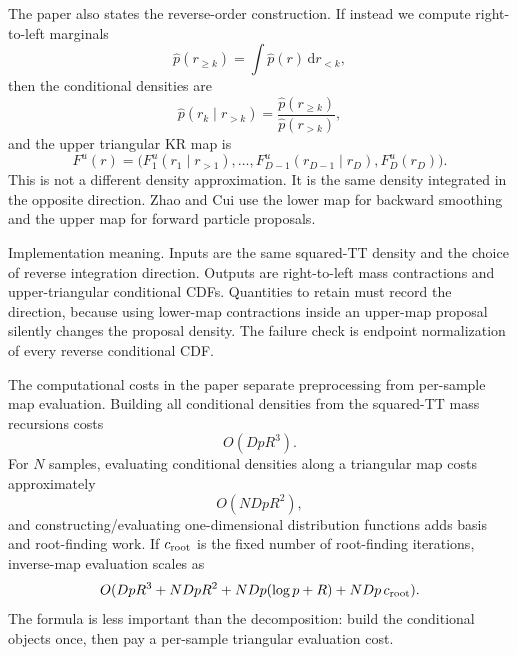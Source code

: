 \documentclass[11pt]{article}
\numberwithin{equation}{section}
\newcommand{\dd}{\,\mathrm d}
\begin{document}
The paper also states the reverse-order construction.  If instead we compute
right-to-left marginals
\begin{equation}
    \widehat p(r_{\ge k})
    =
    \int \widehat p(r)\dd r_{<k},
    \label{eq:p24-k6}
\end{equation}
then the conditional densities are
\begin{equation}
    \widehat p(r_k\mid r_{>k})
    =
    \frac{\widehat p(r_{\ge k})}{\widehat p(r_{>k})},
    \label{eq:p24-k7}
\end{equation}
and the upper triangular KR map is
\begin{equation}
    F^u(r)
    =
    \bigl(
    F^u_1(r_1\mid r_{>1}),\ldots,
    F^u_{D-1}(r_{D-1}\mid r_D),F^u_D(r_D)
    \bigr).
    \label{eq:p24-k8}
\end{equation}
This is not a different density approximation.  It is the same density
integrated in the opposite direction.  Zhao and Cui \cite{zhao2024ttsequential} use the lower map for
backward smoothing and the upper map for forward particle proposals.

Implementation meaning. Inputs are the same squared-TT density
and the choice of reverse integration direction.  Outputs are right-to-left
mass contractions and upper-triangular conditional CDFs.  Quantities to retain must
record the direction, because using lower-map contractions inside an upper-map
proposal silently changes the proposal density.  The failure check is endpoint
normalization of every reverse conditional CDF.

The computational costs in the paper separate preprocessing from per-sample
map evaluation.  Building all conditional densities from the squared-TT mass
recursions costs
\begin{equation}
    O(DpR^3).
    \label{eq:p24-k9}
\end{equation}
For \(N\) samples, evaluating conditional densities along a triangular map
costs approximately
\begin{equation}
    O(NDpR^2),
    \label{eq:p24-k10}
\end{equation}
and constructing/evaluating one-dimensional distribution functions adds basis
and root-finding work.  If \(c_{\rm root}\) is the fixed number of root-finding
iterations, inverse-map evaluation scales as
\begin{equation}
    O(DpR^3+NDpR^2+NDp(\log p+R)+NDp\,c_{\rm root}).
    \label{eq:p24-k11}
\end{equation}
The formula is less important than the decomposition: build the conditional
objects once, then pay a per-sample triangular evaluation cost.
\end{document}
